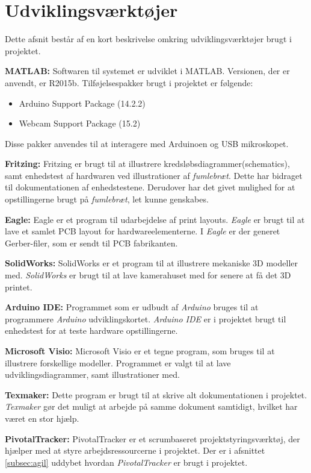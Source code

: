\newpage
\section{Udviklingsværktøjer}
Dette afsnit består af en kort beskrivelse omkring udviklingsværktøjer brugt i projektet.

\textbf{MATLAB:} Softwaren til systemet er udviklet i MATLAB. Versionen, der er anvendt, er R2015b. Tilføjelsespakker brugt i projektet er følgende:
\begin{itemize}
\item Arduino Support Package (14.2.2)
\item Webcam Support Package (15.2)
\end{itemize}
Disse pakker anvendes til at interagere med Arduinoen og USB mikroskopet. 

\textbf{Fritzing:} Fritzing er brugt til at illustrere kredsløbsdiagrammer(schematics), samt enhedstest af hardwaren ved illustrationer af \textit{fumlebræt}. Dette har bidraget til dokumentationen af  enhedstestene. Derudover har det givet mulighed for at opstillingerne brugt på \textit{fumlebræt}, let kunne genskabes.

\textbf{Eagle:} Eagle er et program til udarbejdelse af print layouts. \textit{Eagle} er brugt til at lave et samlet PCB layout for hardwareelementerne. I \textit{Eagle} er der generet Gerber-filer, som er sendt til PCB fabrikanten.

\textbf{SolidWorks:} SolidWorks er et program til at illustrere mekaniske 3D modeller med.  \textit{SolidWorks} er brugt til at lave kamerahuset med for senere at få det 3D printet.

\textbf{Arduino IDE:} Programmet som er udbudt af \textit{Arduino} bruges til at programmere \textit{Arduino} udviklingskortet. \textit{Arduino IDE} er i projektet brugt til enhedstest for at teste hardware opstillingerne. 

\textbf{Microsoft Visio:} Microsoft Visio er et tegne program, som bruges til at illustrere forskellige modeller. Programmet er valgt til at lave udviklingsdiagrammer, samt illustrationer med. 

\textbf{Texmaker:} Dette program er brugt til at skrive alt dokumentationen i projektet. \textit{Texmaker} gør det muligt at arbejde på samme dokument samtidigt, hvilket har været en stor hjælp.

\textbf{PivotalTracker:} PivotalTracker er et scrumbaseret projektstyringsværktøj, der hjælper med at styre arbejdsressourcerne i projektet. Der er i afsnittet \ref{subsec:agil} uddybet hvordan \textit{PivotalTracker} er brugt i projektet.

